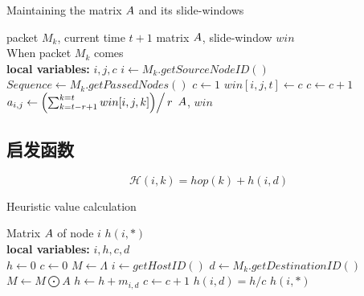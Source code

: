 \begin{algorithm}[tbp] %
\caption{Maintaining the matrix $\boldmath{A}$ and its slide-windows} %
\label{alg:chap5_matrix} %
\begin{algorithmic}[1] %
\REQUIRE  %
packet $M_k$, current time $t+1$
\ENSURE  %
matrix $\boldmath{A}$, slide-window $win$ \\
When packet $M_k$ comes\\
\textbf{local variables:} $i,j,c$
\STATE $i\leftarrow M_k.getSourceNodeID()$
\STATE $Sequence\leftarrow M_k.getPassedNodes()$
\STATE $c\leftarrow 1$
    \STATE $win[i,j,t]\leftarrow c$
    \STATE $c\leftarrow c+1$
\ENDFOR
{}
        \STATE $a_{i,j}\leftarrow \left(\sum_{k=t-r+1}^{k=t}win[i,j,k]\middle)\right/r$
    \ENDFOR
\ENDFOR
\RETURN $\boldmath{A}$, $win$ %
\end{algorithmic}
\end{algorithm}

\subsection{启发函数}
\label{chap5:启发函数}

\begin{equation}
\label{eq:H}
\mathcal{H}(i,k) = hop(k) + h(i, d)
\end{equation}

\begin{algorithm}[tbp] %
\caption{Heuristic value calculation} %
\label{alg:chap5_heuristic} %
\begin{algorithmic}[1] %
\REQUIRE  %
Matrix $\boldmath{A}$ of node $i$
\ENSURE  %
$h(i,*)$\\
\textbf{local variables:} $i,h,c,d$ \\
    \STATE $h\leftarrow 0$
    \STATE $c\leftarrow 0$
    \STATE $M\leftarrow \Lambda$
    \STATE $i\leftarrow getHostID()$
    \STATE $d\leftarrow M_k.getDestinationID()$
    \REPEAT
        \STATE $M\leftarrow M\bigodot A$
        \STATE $h\leftarrow h+m_{i,d}$
        \STATE $c\leftarrow c+1$
    \STATE $h(i,d)=h/c$
\ENDFOR
\RETURN $h(i,*)$ %
\end{algorithmic}
\end{algorithm}

